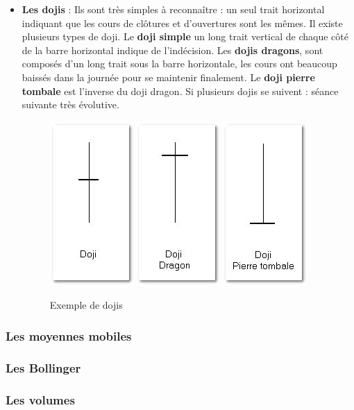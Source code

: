 \begin{itemize}
\item \textbf{Les dojis} : Ils sont très simples à reconnaître : un seul trait horizontal indiquant que les cours de clôtures et d’ouvertures sont les mêmes. Il existe plusieurs types de doji. Le \textbf{doji simple} un long trait vertical de chaque côté de la barre horizontal indique de l’indécision. Les \textbf{dojis dragons}, sont composés d’un long trait sous la barre horizontale, les cours ont beaucoup baissés dans la journée pour se maintenir finalement. Le \textbf{doji pierre tombale} est l’inverse du doji dragon. Si plusieurs dojis se suivent : séance suivante très évolutive.
\begin{figure}[H]
  \center
  \includegraphics[scale=0.5]{../graph/chandelier9.png}
  \includegraphics[scale=0.5]{../graph/chandelier10.png}
  \includegraphics[scale=0.5]{../graph/chandelier11.png}  
  \caption{Exemple de dojis}
\end{figure} 
\end{itemize}

\subsubsection{Les moyennes mobiles}

\subsubsection{Les Bollinger}

\subsubsection{Les volumes}


